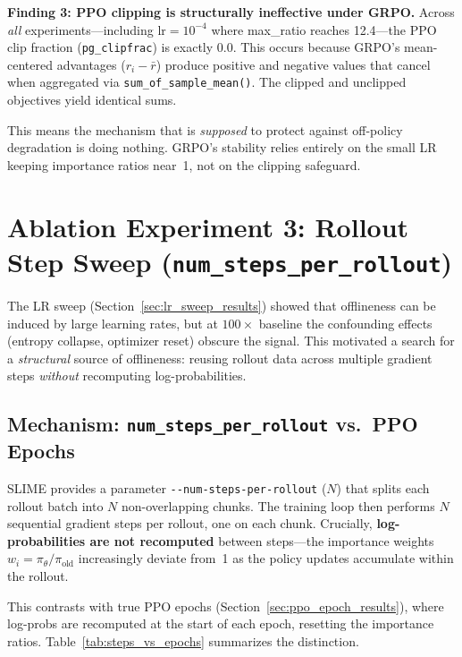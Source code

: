 \documentclass[11pt,a4paper]{article}
\begin{document}
\begin{keyinsight}
\textbf{Finding 3: PPO clipping is structurally ineffective under GRPO.}
Across \emph{all} experiments---including $\mathrm{lr} = 10^{-4}$ where
max\_ratio reaches 12.4---the PPO clip fraction (\texttt{pg\_clipfrac}) is
exactly 0.0. This occurs because GRPO's mean-centered advantages ($r_i -
\bar{r}$) produce positive and negative values that cancel when aggregated via
\texttt{sum\_of\_sample\_mean()}. The clipped and unclipped objectives yield
identical sums.

This means the mechanism that is \emph{supposed} to protect against off-policy
degradation is doing nothing. GRPO's stability relies entirely on the small LR
keeping importance ratios near~1, not on the clipping safeguard.
\end{keyinsight}


\section{Ablation Experiment 3: Rollout Step Sweep (\texttt{num\_steps\_per\_rollout})}
\label{sec:steps_per_rollout_results}

The LR sweep (Section~\ref{sec:lr_sweep_results}) showed that offlineness can be
induced by large learning rates, but at $100\times$ baseline the confounding
effects (entropy collapse, optimizer reset) obscure the signal. This motivated
a search for a \emph{structural} source of offlineness: reusing rollout data
across multiple gradient steps \emph{without} recomputing log-probabilities.

\subsection{Mechanism: \texttt{num\_steps\_per\_rollout} vs.\ PPO Epochs}

SLIME provides a parameter \texttt{-{}-num-steps-per-rollout} ($N$) that splits
each rollout batch into $N$ non-overlapping chunks. The training loop then
performs $N$ sequential gradient steps per rollout, one on each chunk. Crucially,
\textbf{log-probabilities are not recomputed} between steps---the importance
weights $w_i = \pi_\theta / \pi_{\mathrm{old}}$ increasingly deviate from~1 as
the policy updates accumulate within the rollout.

This contrasts with true PPO epochs (Section~\ref{sec:ppo_epoch_results}), where
log-probs are recomputed at the start of each epoch, resetting the importance
ratios. Table~\ref{tab:steps_vs_epochs} summarizes the distinction.
\end{document}
